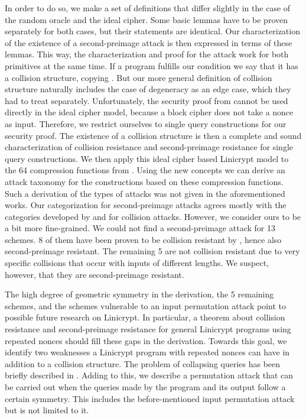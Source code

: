 In order to do so, we make a set of definitions that differ slightly in the case of the random oracle and the ideal cipher.
Some basic lemmas have to be proven separately for both cases, but their statements are identical.
Our characterization of the existence of a second-preimage attack is then expressed in terms of these lemmas.
This way, the characterization and proof for the attack work for both primitives at the same time.
If a program fulfills our condition we say that it has a collision structure, copying \cite{TCC:McQSwoRos19}.
But our more general definition of collision structure naturally includes the case of degeneracy as an edge case,
which they had to treat separately.
Unfortunately, the security proof from \cite{TCC:McQSwoRos19} cannot be used directly in the ideal cipher model,
because a block cipher does not take a nonce as input.
Therefore, we restrict ourselves to single query constructions for our security proof.
The existence of a collision structure is then a complete and sound characterization of collision resistance and second-preimage resistance for single query constructions.
We then apply this ideal cipher based Linicrypt model to the 64 compression functions from \cite{C:PreGovVan93}.
Using the new concepts we can derive an attack taxonomy for the \MD constructions based on these compression functions.
Such a derivation of the types of attacks was not given in the aforementioned works.
Our categorization for second-preimage attacks agrees mostly with the categories developed by \cite{C:PreGovVan93} and \cite{C:BlaRogShr02} for collision attacks.
However, we consider ours to be a bit more fine-grained.
We could not find a second-preimage attack for 13 schemes.
8 of them have been proven to be collision resistant by \cite{C:BlaRogShr02},
hence also second-preimage resistant.
The remaining 5 are not collision resistant due to very specific collisions that occur with inputs of different lengths.
We suspect, however, that they are second-preimage resistant.

The high degree of geometric symmetry in the derivation,
the 5 remaining schemes, and the schemes vulnerable to an input permutation attack point to possible future research on Linicrypt.
In particular,
a theorem about collision resistance and second-preimage resistance for general Linicrypt programs using repeated nonces should fill these gaps in the derivation.
Towards this goal, we identify two weaknesses a Linicrypt program with repeated nonces can have in addition to a collision structure.
The problem of collapsing queries has been briefly described in \cite{TCC:McQSwoRos19}.
Adding to this, we describe a permutation attack that can be carried out when the queries made by the program and its output follow a certain symmetry.
This includes the before-mentioned input permutation attack but is not limited to it.